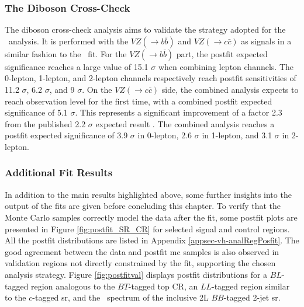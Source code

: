 \subsubsection{The Diboson Cross-Check}\label{subsec-DibosonC}
The diboson cross-check analysis aims to validate the strategy adopted for the \vhbc\ analysis. It is performed with the $VZ (\rightarrow b\bar{b})$ and $VZ (\rightarrow c\bar{c})$ as signals in a similar fashion to the \vhbc\ fit. For the $VZ (\rightarrow b\bar{b})$ part, the postfit expected significance reaches a large value of 15.1 $\sigma$ when combining lepton channels. The 0-lepton, 1-lepton, and 2-lepton channels respectively reach postfit sensitivities of 11.2 $\sigma$, 6.2 $\sigma$, and 9 $\sigma$. On the $VZ (\rightarrow c\bar{c})$ side, the combined analysis expects to reach observation level for the first time, with a combined postfit expected significance of 5.1 $\sigma$. This represents a significant improvement of a factor 2.3 from the published 2.2 $\sigma$ expected result \cite{Collaboration:2721696}. The combined analysis reaches a postfit expected significance of 3.9 $\sigma$ in 0-lepton, 2.6 $\sigma$ in 1-lepton, and 3.1 $\sigma$ in 2-lepton.

\subsubsection{Additional Fit Results}
In addition to the main results highlighted above, some further insights into the output of the fits are given before concluding this chapter. To verify that the Monte Carlo samples correctly model the data after the fit, some postfit plots are presented in Figure \ref{fig:postfit_SR_CR} for selected signal and control regions. All the postfit distributions are listed in Appendix \ref{appsec-vh-analRegPosfit}. The good agreement between the data and postfit \gls{mc} samples is also observed in validation regions not directly constrained by the fit, supporting the chosen analysis strategy. Figure \ref{fig:postfitval} displays postfit distributions for a $BL$-tagged region analogous to the $BT$-tagged top CR, an $LL$-tagged region similar to the $c$-tagged \gls{sr}, and the \ptv\ spectrum of the inclusive 2L $BB$-tagged 2-jet \gls{sr}. \\ %

